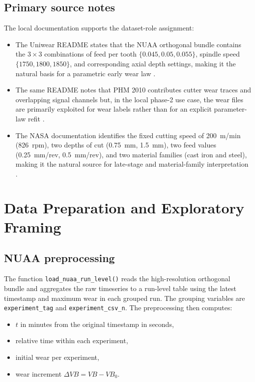 \documentclass[11pt,a4paper]{article}
\newcommand{\vb}{V\!B}
\newcommand{\code}[1]{\texttt{#1}}
\begin{document}
\subsection{Primary source notes}

The local documentation supports the dataset-role assignment:

\begin{itemize}[leftmargin=1.6em]
\item The Uniwear README states that the NUAA orthogonal bundle contains the \(3 \times 3\) combinations of
feed per tooth \(\{0.045, 0.05, 0.055\}\), spindle speed \(\{1750, 1800, 1850\}\), and corresponding axial depth settings,
making it the natural basis for a parametric early wear law \cite{uniwearrepo}.
\item The same README notes that PHM 2010 contributes cutter wear traces and overlapping signal channels but, in the
local phase-2 use case, the wear files are primarily exploited for wear labels rather than for an explicit parameter-law refit \cite{uniwearrepo}.
\item The NASA documentation identifies the fixed cutting speed of \SI{200}{m/min} (\SI{826}{rpm}),
two depths of cut (\SI{0.75}{mm}, \SI{1.5}{mm}), two feed values (\SI{0.25}{mm/rev}, \SI{0.5}{mm/rev}),
and two material families (cast iron and steel), making it the natural source for late-stage and material-family interpretation \cite{nasa_doc}.
\end{itemize}

\section{Data Preparation and Exploratory Framing}

\subsection{NUAA preprocessing}

The function \code{load\_nuaa\_run\_level()} reads the high-resolution orthogonal bundle and aggregates the raw
timeseries to a run-level table using the latest timestamp and maximum wear in each grouped run. The grouping
variables are \code{experiment\_tag} and \code{experiment\_csv\_n}. The preprocessing then computes:

\begin{itemize}[leftmargin=1.6em]
\item \(t\) in minutes from the original timestamp in seconds,
\item relative time within each experiment,
\item initial wear per experiment,
\item wear increment \(\Delta \vb = \vb - \vb_0\).
\end{itemize}
\end{document}
